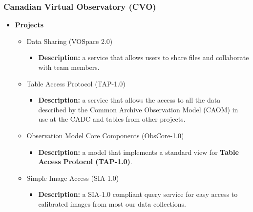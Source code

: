 \subsubsection{Canadian Virtual Observatory (CVO)}
\begin{itemize}
\item \textbf{Projects}
\begin{itemize}
\item Data Sharing (VOSpace 2.0)
\begin{itemize}
\item \textbf{Description:} a service that allows users to share files and
collaborate with team members.
\end{itemize}
\item Table Access Protocol (TAP-1.0)
\begin{itemize}
\item \textbf{Description:} a service that allows the access to all the data
described by the Common Archive Observation Model (CAOM) in use at the CADC and
tables from other projects.
\end{itemize}
\item Observation Model Core Components (ObsCore-1.0)
\begin{itemize}
\item \textbf{Description:} a model that implements a standard view for
\textbf{Table Access Protocol (TAP-1.0)}.
\end{itemize}
\item Simple Image Access (SIA-1.0)
\begin{itemize}
\item \textbf{Description:} a SIA-1.0 compliant query service for easy access to
calibrated images from most our data collections.
\end{itemize}
\end{itemize}
\end{itemize}

